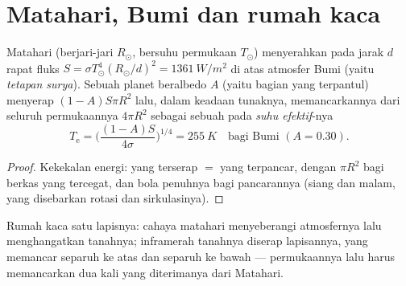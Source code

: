 \section{Matahari, Bumi dan rumah kaca}

\begin{proposition}\label{prop:b2:thermal-radiation:earth}
Matahari (berjari-jari $R_\odot$, bersuhu permukaan $T_\odot$) menyerahkan pada
jarak $d$ rapat fluks $S = \sigma T_\odot^4 (R_\odot/d)^2 =
\qty{1361}{W/m^2}$ di atas atmosfer Bumi (yaitu \emph{tetapan
surya}). Sebuah planet beralbedo $A$ (yaitu bagian
yang terpantul) menyerap $(1 - A)S\pi R^2$ lalu, dalam keadaan tunaknya, memancarkannya
dari seluruh permukaannya $4\pi R^2$ sebagai sebuah  pada \emph{suhu
efektif}-nya
\[
T_{\text{e}} = \Big(\frac{(1 - A)S}{4\sigma}\Big)^{1/4} = \qty{255}{K}
\quad\text{bagi Bumi } (A = 0.30) .
\]
\end{proposition}

\begin{proof}
Kekekalan energi: yang terserap $=$ yang terpancar, dengan  $\pi R^2$
bagi berkas yang tercegat, dan bola penuhnya bagi pancarannya (siang dan
malam, yang disebarkan rotasi dan sirkulasinya).
\end{proof}

\begin{omfigure}

{\small Rumah kaca satu lapisnya: cahaya matahari menyeberangi atmosfernya lalu
menghangatkan tanahnya; inframerah tanahnya diserap lapisannya, yang
memancar separuh ke atas dan separuh ke bawah --- permukaannya lalu harus memancarkan dua kali
yang diterimanya dari Matahari.}
\end{omfigure}

